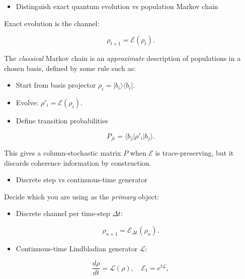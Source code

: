 \documentclass[11pt]{article}
\begin{document}
\begin{itemize}
\item Distinguish exact quantum evolution vs population Markov chain  
\end{itemize}
  Exact evolution is the channel:
  
\begin{equation}
\rho_{t+1} = \mathcal{E}(\rho_t).
\end{equation}

  The \textit{classical} Markov chain is an \textit{approximate} description of populations in a chosen basis, defined by some rule such as:
\begin{itemize}
\item Start from basis projector $\rho_i = |b_i\rangle\langle b_i|$.
\item Evolve: $\rho'_i = \mathcal{E}(\rho_i)$.
\item Define transition probabilities
\end{itemize}
    
\begin{equation}
P_{ji} = \langle b_j | \rho'_i | b_j \rangle.
\end{equation}

  This gives a column-stochastic matrix $P$ when $\mathcal{E}$ is trace-preserving, but it discards coherence information by construction.

\begin{itemize}
\item Discrete step vs continuous-time generator  
\end{itemize}
  Decide which you are using as the \textit{primary} object:

\begin{itemize}
\item Discrete channel per time-step $\Delta t$:
\end{itemize}
    
\begin{equation}
\rho_{n+1} = \mathcal{E}_{\Delta t}(\rho_n).
\end{equation}

\begin{itemize}
\item Continuous-time Lindbladian generator $\mathcal{L}$:
\end{itemize}
    
\begin{equation}
\frac{d\rho}{dt} = \mathcal{L}(\rho), \quad
    \mathcal{E}_t = e^{t \mathcal{L}},
\end{equation}
\end{document}
